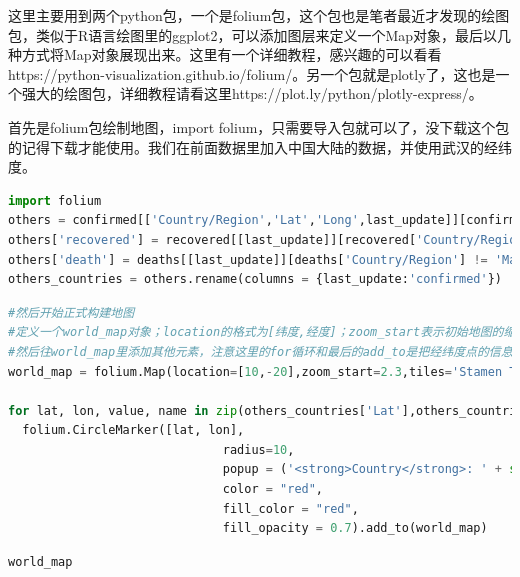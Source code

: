 \documentclass[UTF8,a4paper,12pt]{ctexart}  %
\begin{document}
这里主要用到两个python包，一个是folium包，这个包也是笔者最近才发现的绘图包，类似于R语言绘图里的ggplot2，可以添加图层来定义一个Map对象，最后以几种方式将Map对象展现出来。这里有一个详细教程，感兴趣的可以看看https://python-visualization.github.io/folium/。另一个包就是plotly了，这也是一个强大的绘图包，详细教程请看这里https://plot.ly/python/plotly-express/。

首先是folium包绘制地图，import folium，只需要导入包就可以了，没下载这个包的记得下载才能使用。我们在前面数据里加入中国大陆的数据，并使用武汉的经纬度。

\begin{lstlisting}[language=Python]
import folium
others = confirmed[['Country/Region','Lat','Long',last_update]][confirmed['Country/Region'] != 'Mainland China']
others['recovered'] = recovered[[last_update]][recovered['Country/Region'] != 'Mainland China']
others['death'] = deaths[[last_update]][deaths['Country/Region'] != 'Mainland China']
others_countries = others.rename(columns = {last_update:'confirmed'})
\end{lstlisting}

\begin{lstlisting}[language=Python]
#然后开始正式构建地图
#定义一个world_map对象；location的格式为[纬度,经度]；zoom_start表示初始地图的缩放尺寸，数值越大放大程度越大；tiles为地图类型，用于控制绘图调用的地图样式，默认为'OpenStreetMap'，也有一些其他的内建地图样式，如'Stamen  Terrain'、'Stamen Toner'、'Mapbox Bright'、'Mapbox Control Room'等；也可以传入'None'来绘制一个没有风格的朴素地图，或传入一个URL来使用其它的自选osm。
#然后往world_map里添加其他元素，注意这里的for循环和最后的add_to是把经纬度点的信息一个一个的加进去
world_map = folium.Map(location=[10,-20],zoom_start=2.3,tiles='Stamen Toner')

for lat, lon, value, name in zip(others_countries['Lat'],others_countries['Long'],others_countries['confirmed'],others_countries['Country/Region']):
  folium.CircleMarker([lat, lon],
                              radius=10,
                              popup = ('<strong>Country</strong>: ' + str(name).capitalize()+'<br>' '<strong>Confirmed Cases</strong>: ' + str(value) + '<br>'),
                              color = "red",
                              fill_color = "red",
                              fill_opacity = 0.7).add_to(world_map)
\end{lstlisting}

\begin{lstlisting}[language=Python]
world_map
\end{lstlisting}
\end{document}
